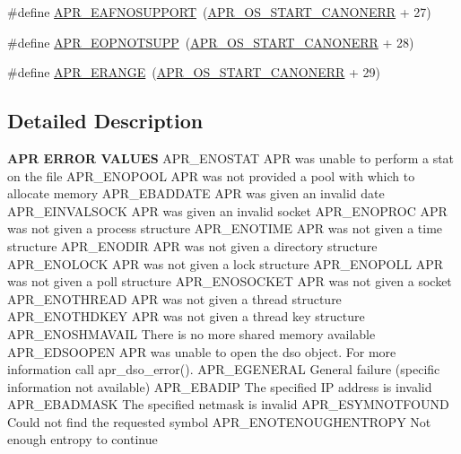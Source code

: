 \begin{DoxyCompactItemize}
\item 
\#define \hyperlink{group__APR__Error_ga76b558840838bcb94a4811a8e52df7a6}{A\+P\+R\+\_\+\+E\+A\+F\+N\+O\+S\+U\+P\+P\+O\+RT}~(\hyperlink{group__apr__errno_ga7bca957c11b80b31cb54b0d2cbe9e025}{A\+P\+R\+\_\+\+O\+S\+\_\+\+S\+T\+A\+R\+T\+\_\+\+C\+A\+N\+O\+N\+E\+RR} + 27)
\item 
\#define \hyperlink{group__APR__Error_ga6f02032ddad10077dbc9872ec4a6030e}{A\+P\+R\+\_\+\+E\+O\+P\+N\+O\+T\+S\+U\+PP}~(\hyperlink{group__apr__errno_ga7bca957c11b80b31cb54b0d2cbe9e025}{A\+P\+R\+\_\+\+O\+S\+\_\+\+S\+T\+A\+R\+T\+\_\+\+C\+A\+N\+O\+N\+E\+RR} + 28)
\item 
\#define \hyperlink{group__APR__Error_gaa8522357f7cc63343895901d107b0222}{A\+P\+R\+\_\+\+E\+R\+A\+N\+GE}~(\hyperlink{group__apr__errno_ga7bca957c11b80b31cb54b0d2cbe9e025}{A\+P\+R\+\_\+\+O\+S\+\_\+\+S\+T\+A\+R\+T\+\_\+\+C\+A\+N\+O\+N\+E\+RR} + 29)
\end{DoxyCompactItemize}


\subsection{Detailed Description}

\begin{DoxyPre}
{\bfseries APR ERROR VALUES}
APR\_ENOSTAT      APR was unable to perform a stat on the file
APR\_ENOPOOL      APR was not provided a pool with which to allocate memory
APR\_EBADDATE     APR was given an invalid date
APR\_EINVALSOCK   APR was given an invalid socket
APR\_ENOPROC      APR was not given a process structure
APR\_ENOTIME      APR was not given a time structure
APR\_ENODIR       APR was not given a directory structure
APR\_ENOLOCK      APR was not given a lock structure
APR\_ENOPOLL      APR was not given a poll structure
APR\_ENOSOCKET    APR was not given a socket
APR\_ENOTHREAD    APR was not given a thread structure
APR\_ENOTHDKEY    APR was not given a thread key structure
APR\_ENOSHMAVAIL  There is no more shared memory available
APR\_EDSOOPEN     APR was unable to open the dso object.  For more
                 information call apr\_dso\_error().
APR\_EGENERAL     General failure (specific information not available)
APR\_EBADIP       The specified IP address is invalid
APR\_EBADMASK     The specified netmask is invalid
APR\_ESYMNOTFOUND Could not find the requested symbol
APR\_ENOTENOUGHENTROPY Not enough entropy to continue
\end{DoxyPre}



